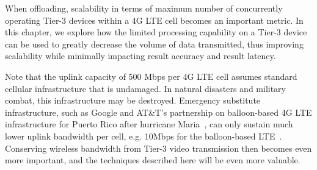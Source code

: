 When offloading, scalability in terms of maximum number of concurrently
operating Tier-3 devices within a 4G LTE cell becomes an important metric.  In
this chapter, we explore how the limited processing capability on a Tier-3 device
can be used to greatly decrease the volume of data transmitted, thus improving
scalability while minimally impacting result accuracy and result latency.

Note that the uplink capacity of 500 Mbps per 4G LTE cell assumes standard
cellular infrastructure that is undamaged.  In natural disasters and military
combat, this infrastructure may be destroyed. Emergency substitute
infrastructure, such as Google and AT\&T's partnership on balloon-based 4G LTE
infrastructure for Puerto Rico after hurricane Maria~\cite{Morse2017}, can only
sustain much lower uplink bandwidth per cell, e.g. 10Mbps for the balloon-based
LTE~\cite{Sankaran2018}.  Conserving wireless bandwidth from Tier-3 video
transmission then becomes even more important, and the techniques described here
will be even more valuable.

